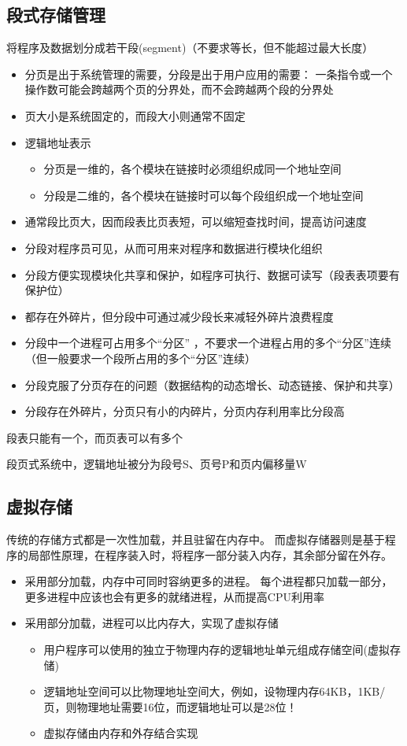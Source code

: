 \subsection{段式存储管理}
将程序及数据划分成若干段(segment)（不要求等长，但不能超过最大长度）
\begin{itemize}
    \item 分页是出于系统管理的需要，分段是出于用户应用的需要：
    一条指令或一个操作数可能会跨越两个页的分界处，而不会跨越两个段的分界处
    \item 页大小是系统固定的，而段大小则通常不固定
    \item 逻辑地址表示
    \begin{itemize}
    \item 分页是一维的，各个模块在链接时必须组织成同一个地址空间
    \item 分段是二维的，各个模块在链接时可以每个段组织成一个地址空间
    \end{itemize}
    \item 通常段比页大，因而段表比页表短，可以缩短查找时间，提高访问速度
    \item 分段对程序员可见，从而可用来对程序和数据进行模块化组织
    \item 分段方便实现模块化共享和保护，如程序可执行、数据可读写（段表表项要有保护位）
    \item 都存在外碎片，但分段中可通过减少段长来减轻外碎片浪费程度
    \item 分段中一个进程可占用多个“分区” ，不要求一个进程占用的多个“分区”连续（但一般要求一个段所占用的多个“分区”连续）
    \item 分段克服了分页存在的问题（数据结构的动态增长、动态链接、保护和共享）
    \item 分段存在外碎片，分页只有小的内碎片，分页内存利用率比分段高
\end{itemize}

段表只能有一个，而页表可以有多个

段页式系统中，逻辑地址被分为段号S、页号P和页内偏移量W

\subsection{虚拟存储}
传统的存储方式都是一次性加载，并且驻留在内存中。
而虚拟存储器则是基于程序的局部性原理，在程序装入时，将程序一部分装入内存，其余部分留在外存。
\begin{itemize}
    \item 采用部分加载，内存中可同时容纳更多的进程。
每个进程都只加载一部分，更多进程中应该也会有更多的就绪进程，从而提高CPU利用率
    \item 采用部分加载，进程可以比内存大，实现了虚拟存储
    \begin{itemize}
\item 用户程序可以使用的独立于物理内存的逻辑地址单元组成存储空间(虚拟存储)
\item 逻辑地址空间可以比物理地址空间大，例如，设物理内存64KB，1KB/页，则物理地址需要16位，而逻辑地址可以是28位！
\item 虚拟存储由内存和外存结合实现
    \end{itemize}
\end{itemize}

